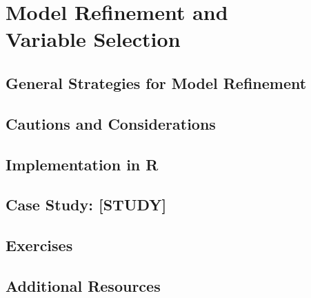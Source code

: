 
\chapter{Model Refinement and\\ Variable Selection}

\section{General Strategies for Model Refinement}

\section{Cautions and Considerations}

\section{Implementation in R}

\section{Case Study: [STUDY]}

\section{Exercises}

\section{Additional Resources}
